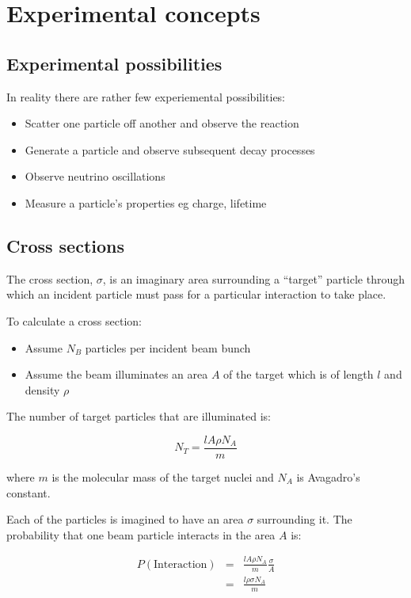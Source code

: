 \chapter{Experimental concepts}

\section{Experimental possibilities}

In reality there are rather few experiemental possibilities:
\begin{itemize}
  \item Scatter one particle off another and observe the reaction
  \item Generate a particle and observe subsequent decay processes
  \item Observe neutrino oscillations
  \item Measure a particle's properties eg charge, lifetime
\end{itemize}

\section{Cross sections}

The cross section, $\sigma$, is an imaginary area surrounding a ``target'' particle through which an incident particle must pass for a particular interaction to take place.

To calculate a cross section:
\begin{itemize}
  \item Assume $N_B$ particles per incident beam bunch
  \item Assume the beam illuminates an area $A$ of the target which is of length $l$ and density $\rho$
\end{itemize}

The number of target particles that are illuminated is:

\[
  N_T = \frac{lA\rho N_A}{m}
\]

where $m$ is the molecular mass of the target nuclei and $N_A$ is Avagadro's constant.

Each of the particles is imagined to have an area $\sigma$ surrounding it.  The probability that one beam particle interacts in the area $A$ is:

\begin{eqnarray*}
  P(\textrm{Interaction}) & = & \frac{l A\rho N_A}{m}\frac{\sigma}{A} \\
  & = & \frac{l \rho \sigma N_A}{m}
\end{eqnarray*}

